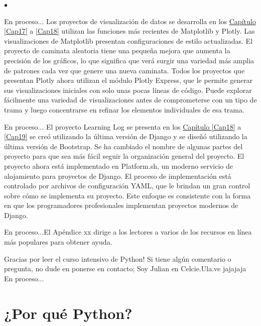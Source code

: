 \begin{list}{$\bullet$}{}
    \item   En proceso... Los proyectos de visualización de datos se desarrolla en los \hyperlink{Cap15}{Capítulo \ref{Cap17}} a \ref{Cap18}  utilizan las funciones más recientes de Matplotlib y Plotly. Las visualizaciones de Matplotlib presentan configuraciones de estilo actualizadas. El proyecto de caminata aleatoria tiene una pequeña mejora que aumenta la precisión de los gráficos, lo que significa que verá surgir una variedad más amplia de patrones cada vez que genere una nueva caminata. Todos los proyectos que presentan Plotly ahora utilizan el módulo Plotly Express, que le permite generar sus visualizaciones iniciales con solo unas pocas líneas de código. Puede explorar fácilmente una variedad de visualizaciones antes de comprometerse con un tipo de trama y luego concentrarse en refinar los elementos individuales de esa trama.

    \item  En proceso... El proyecto Learning Log se presenta en los \hyperlink{Cap11}{Capítulo \ref{Cap18}} a  \ref{Cap19} se creó utilizando la última versión de Django y se diseñó utilizando la última versión de Bootstrap. Se ha cambiado el nombre de algunas partes del proyecto para que sea más fácil seguir la organización general del proyecto. El proyecto ahora está implementado en Platform.sh, un moderno servicio de alojamiento para proyectos de Django. El proceso de implementación está controlado por archivos de configuración YAML, que le brindan un gran control sobre cómo se implementa su proyecto. Este enfoque es consistente con la forma en que los programadores profesionales implementan proyectos modernos de Django.

   \item  En proceso...El Apéndice xx dirige a los lectores a varios de los recursos en línea más populares para obtener ayuda. 
\end{list} 


Gracias por leer el curso intensivo de Python! Si tiene algún comentario o pregunta, no dude en ponerse en contacto;  Soy Julian en Celcie.Ula.ve  jajajaja   En proceso...





\section*{¿Por qué Python?}

